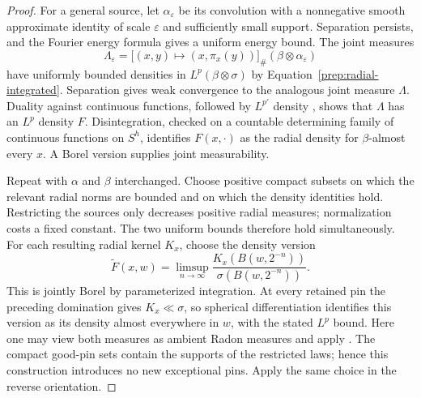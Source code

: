 \begin{proof}
For a general source, let $\alpha_\varepsilon$ be its convolution with
a nonnegative smooth approximate identity of scale $\varepsilon$ and
sufficiently small support. Separation persists, and the
Fourier energy formula gives a uniform energy bound. The joint
measures
\[
 \Lambda_\varepsilon
 =\bigl[(x,y)\mapsto(x,\pi_x(y))\bigr]_\#
       (\beta\otimes\alpha_\varepsilon)
\]
have uniformly bounded densities in $L^p(\beta\otimes\sigma)$ by
Equation~\eqref{prep:radial-integrated}. Separation gives weak
convergence to the analogous joint measure $\Lambda$.
Duality against continuous functions, followed by $L^{p'}$ density
\cite[Theorem~6.15 and Proposition~7.9]{Folland1999},
shows that $\Lambda$ has an $L^p$ density $F$. Disintegration,
checked on a countable determining family of continuous functions
on $S^h$, identifies $F(x,\cdot)$ as the radial density for
$\beta$-almost every $x$. A Borel version supplies joint measurability.

Repeat with $\alpha$ and $\beta$ interchanged. Choose positive
compact subsets on which the relevant radial norms are bounded and
on which the density identities hold. Restricting the sources only
decreases positive radial measures; normalization costs a fixed
constant. The two uniform bounds therefore hold simultaneously.
For each resulting radial kernel $K_x$, choose the density version
\[
 \widetilde F(x,w)=\limsup_{n\to\infty}
 \frac{K_x(B(w,2^{-n}))}{\sigma(B(w,2^{-n}))}.
\]
This is jointly Borel by parameterized integration. At every retained
pin the preceding domination gives $K_x\ll\sigma$, so spherical
differentiation identifies this version as its density almost
everywhere in $w$, with the stated $L^p$ bound. Here one may view both
measures as ambient Radon measures and apply
\cite[Chapter~1, Theorems~3.23--3.24]{Simon2014}.
The compact good-pin
sets contain the supports of the restricted laws; hence this
construction introduces no new exceptional pins. Apply the same
choice in the reverse orientation.
\end{proof}

